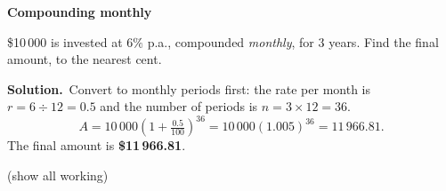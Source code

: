 \documentclass[11pt]{article}
\begin{document}
\begin{workedbox}

{\bfseries\color{chalkdk}Compounding monthly}\par\vspace{3pt}

\$10\,000 is invested at $6\%$ p.a., compounded \emph{monthly}, for $3$ years. Find the final amount, to the nearest cent.\par\vspace{2pt}

{\bfseries Solution.}\ Convert to monthly periods first: the rate per month is $r=6\div12=0.5$ and the number of periods is $n=3\times12=36$. \[ A=10\,000\left(1+\tfrac{0.5}{100}\right)^{36}=10\,000(1.005)^{36}=11\,966.81. \] The final amount is \textbf{\$11\,966.81}.

\end{workedbox}
\newpage
{}\;\textcolor{inksoft}{\small(show all working)}\par\nopagebreak\vspace{2pt}
\end{document}
